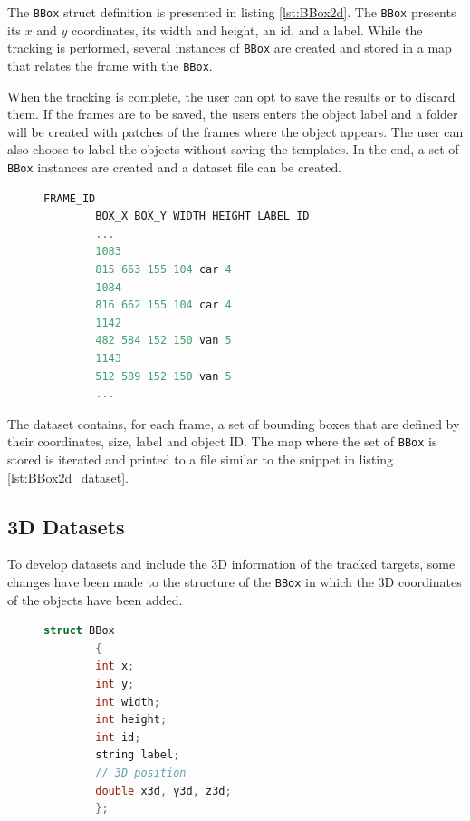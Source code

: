 The \texttt{BBox} struct definition is presented in listing \ref{lst:BBox2d}. The \texttt{BBox} presents its $x$ and $y$ coordinates, its width and height, an id, and a label. While the tracking is performed, several instances of \texttt{BBox} are created and stored in a map that relates the frame with the \texttt{BBox}. 

When the tracking is complete, the user can opt to save the results or to discard them. If the frames are to be saved, the users enters the object label and a folder will be created with patches of the frames where the object appears. The user can also choose to label the objects without saving the templates. In the end, a set of \texttt{BBox} instances are created and a dataset file can be created.

\begin{figure}
	\begin{center}
		\begin{lstlisting}[label={lst:BBox2d_dataset}, caption={2D dataset example snippet},language=c++]
		FRAME_ID 
		BOX_X BOX_Y WIDTH HEIGHT LABEL ID
		...
		1083
		815 663 155 104 car 4
		1084
		816 662 155 104 car 4
		1142
		482 584 152 150 van 5
		1143
		512 589 152 150 van 5
		...\end{lstlisting}
	\end{center}
\end{figure}

The dataset contains, for each frame, a set of bounding boxes that are defined by their coordinates, size, label and object ID. The map where the set of \texttt{BBox} is stored is iterated and printed to a file similar to the snippet in listing \ref{lst:BBox2d_dataset}.


\subsection{3D Datasets}

To develop datasets and include the 3D information of the tracked targets, some changes have been made to the structure of the \texttt{BBox} in which the 3D coordinates of the objects have been added.

\begin{figure}
	\begin{center}
		\begin{lstlisting}[label={lst:bbox3d}, caption={BBox struct definition with 3D capabilities},language=c++]
		struct BBox
		{
		int x;
		int y;
		int width;
		int height;
		int id;
		string label;
		// 3D position
		double x3d, y3d, z3d;
		};		\end{lstlisting}
	\end{center}
\end{figure}


